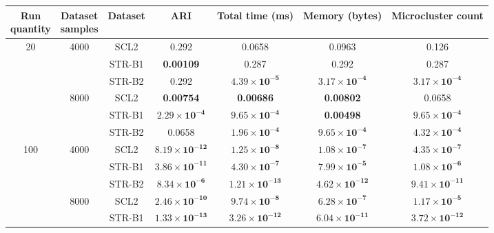\begin{table}
    \centering
    \footnotesize
    \begin{adjustbox}{max width=\textwidth}
    \begin{tabular}{|c|c|c|cccc|}
        \hline
        \makecell{Run \\ quantity} & \makecell{Dataset \\ samples} & Dataset & ARI & Total time (ms) & Memory (bytes) & Microcluster count \\
        \hline
        \multirow{6}{*}{20} & \multirow{3}{*}{4000} & SCL2 & 0.292 & 0.0658 & 0.0963 & 0.126 \\
        \cline{3-7}
         &  & STR-B1 & \textbf{0.00109} & 0.287 & 0.292 & 0.287 \\
        \cline{3-7}
         &  & STR-B2 & 0.292 & $\boldsymbol{4.39 \times 10^{-5}}$ & $\boldsymbol{3.17 \times 10^{-4}}$ & $\boldsymbol{3.17 \times 10^{-4}}$ \\
        \cline{2-7}
         & \multirow{3}{*}{8000} & SCL2 & \textbf{0.00754} & \textbf{0.00686} & \textbf{0.00802} & 0.0658 \\
        \cline{3-7}
         &  & STR-B1 & $\boldsymbol{2.29 \times 10^{-4}}$ & $\boldsymbol{9.65 \times 10^{-4}}$ & \textbf{0.00498} & $\boldsymbol{9.65 \times 10^{-4}}$ \\
        \cline{3-7}
         &  & STR-B2 & 0.0658 & $\boldsymbol{1.96 \times 10^{-4}}$ & $\boldsymbol{9.65 \times 10^{-4}}$ & $\boldsymbol{4.32 \times 10^{-4}}$ \\
        \hline
        \multirow{6}{*}{100} & \multirow{3}{*}{4000} & SCL2 & $\boldsymbol{8.19 \times 10^{-12}}$ & $\boldsymbol{1.25 \times 10^{-8}}$ & $\boldsymbol{1.08 \times 10^{-7}}$ & $\boldsymbol{4.35 \times 10^{-7}}$ \\
        \cline{3-7}
         &  & STR-B1 & $\boldsymbol{3.86 \times 10^{-11}}$ & $\boldsymbol{4.30 \times 10^{-7}}$ & $\boldsymbol{7.99 \times 10^{-5}}$ & $\boldsymbol{1.08 \times 10^{-6}}$ \\
        \cline{3-7}
         &  & STR-B2 & $\boldsymbol{8.34 \times 10^{-6}}$ & $\boldsymbol{1.21 \times 10^{-13}}$ & $\boldsymbol{4.62 \times 10^{-12}}$ & $\boldsymbol{9.41 \times 10^{-11}}$ \\
        \cline{2-7}
         & \multirow{3}{*}{8000} & SCL2 & $\boldsymbol{2.46 \times 10^{-10}}$ & $\boldsymbol{9.74 \times 10^{-8}}$ & $\boldsymbol{6.28 \times 10^{-7}}$ & $\boldsymbol{1.17 \times 10^{-5}}$ \\
        \cline{3-7}
         &  & STR-B1 & $\boldsymbol{1.33 \times 10^{-13}}$ & $\boldsymbol{3.26 \times 10^{-12}}$ & $\boldsymbol{6.04 \times 10^{-11}}$ & $\boldsymbol{3.72 \times 10^{-12}}$ \\

\end{tabular}
\end{adjustbox}
\end{table}
